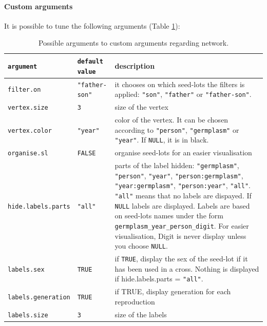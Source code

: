 \documentclass{article}\usepackage[]{graphicx}\usepackage[]{color}
\begin{document}
\paragraph{Custom arguments}

It is possible to tune the following arguments (Table \ref{custom.network}):


\begin{center}
\begin{table}[H]
\begin{tabular}{ p{} p{} p{} }
\hline
\texttt{argument} & \texttt{default value} & description \\
\hline

\texttt{filter.on} & \texttt{"father-son"} & it chooses on which seed-lots the filters is applied: \texttt{"son"}, \texttt{"father"} or \texttt{"father-son"}. \\

\texttt{vertex.size} & \texttt{3} &  size of the vertex \\

\texttt{vertex.color} & \texttt{"year"} & color of the vertex. 
It can be chosen according to  \texttt{"person"}, \texttt{"germplasm"} or \texttt{"year"}. 
If \texttt{NULL}, it is in black. \\

\texttt{organise.sl} & \texttt{FALSE} & organise seed-lots for an easier visualisation \\

\texttt{hide.labels.parts} & \texttt{"all"} & parts of the label hidden: \texttt{"germplasm"}, \texttt{"person"}, \texttt{"year"}, \texttt{"person:germplasm"}, \texttt{"year:germplasm"}, \texttt{"person:year"}, \texttt{"all"}. 
\texttt{"all"} means that no labels are dispayed. 
If \texttt{NULL} labels are displayed. Labels are based on seed-lots names under the form \texttt{germplasm\_year\_person\_digit}.
For easier visualisation, Digit is never display unless you choose \texttt{NULL}.
\\

\texttt{labels.sex} & \texttt{TRUE} & if \texttt{TRUE}, display the sex of the seed-lot if it has been used in a cross. Nothing is displayed if hide.labels.parts = \texttt{"all"}. \\

\texttt{labels.generation} & \texttt{TRUE} & if TRUE, display generation for each reproduction \\

\texttt{labels.size} & \texttt{3} & size of the labels \\
\hline
\end{tabular}
\caption{Possible arguments to custom arguments regarding network.}
\label{custom.network}
\end{table}
\end{center}
\end{document}

